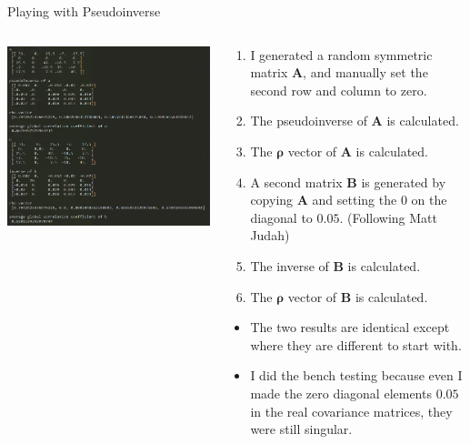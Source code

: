 \documentclass[aspectratio=169]{beamer}
\begin{document}
\begin{frame}{Playing with Pseudoinverse}
\begin{columns}
  \begin{column}{.5\textwidth}
    \includegraphics[width=\textwidth]{figures/pseudoinverse_testing.png}
  \end{column}
  \begin{column}{.5\textwidth}
    \scriptsize
    \begin{enumerate}
      \item I generated a random symmetric matrix $\mathbf{A}$, and manually set the second row and column to zero.
      \item The pseudoinverse of $\mathbf{A}$ is calculated.
      \item The $\boldsymbol{\rho}$ vector of $\mathbf{A}$ is calculated.
      \item A second matrix $\mathbf{B}$ is generated by copying $\mathbf{A}$ and setting the $0$ on the diagonal to $0.05$. (Following Matt Judah)
      \item The inverse of $\mathbf{B}$ is calculated.
      \item The $\boldsymbol{\rho}$ vector of $\mathbf{B}$ is calculated.
    \end{enumerate}
    \begin{itemize}
      \item The two results are identical except where they are different to start with.
      \item I did the bench testing because even I made the zero diagonal elements $0.05$ in the real covariance matrices, they were still singular.
    \end{itemize}
  \end{column}
\end{columns}
\end{frame}
\end{document}
